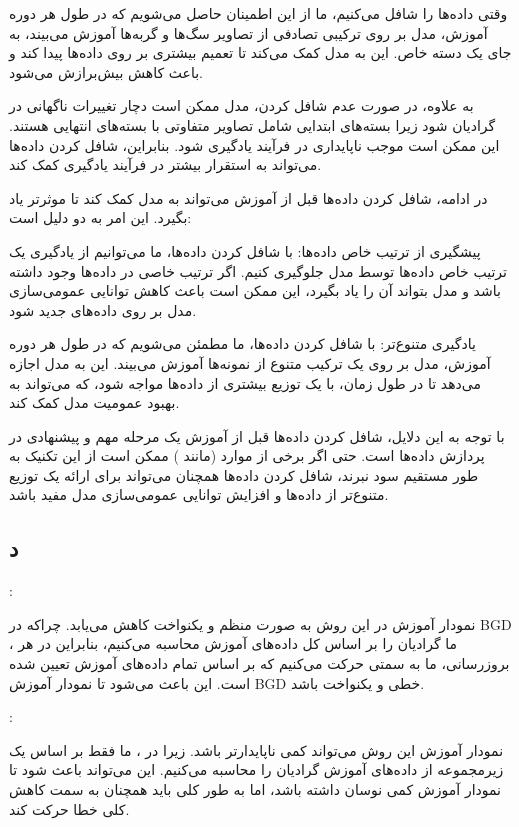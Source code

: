 وقتی داده‌ها را شافل می‌کنیم، ما از این اطمینان حاصل می‌شویم که در طول هر دوره آموزش، مدل بر روی ترکیبی تصادفی از تصاویر سگ‌ها و گربه‌ها آموزش می‌بیند، به جای یک دسته خاص. این به مدل کمک می‌کند تا تعمیم بیشتری بر روی داده‌ها پیدا کند و باعث کاهش بیش‌برازش می‌شود.

به علاوه، در صورت عدم شافل کردن، مدل ممکن است دچار تغییرات ناگهانی در گرادیان شود زیرا بسته‌های ابتدایی شامل تصاویر متفاوتی با بسته‌های انتهایی هستند. این ممکن است موجب ناپایداری در فرآیند یادگیری شود. بنابراین، شافل کردن داده‌ها می‌تواند به استقرار بیشتر در فرآیند یادگیری کمک کند.

در ادامه، شافل کردن داده‌ها قبل از آموزش می‌تواند به مدل کمک کند تا موثرتر یاد بگیرد. این امر به دو دلیل است:

پیشگیری از ترتیب خاص داده‌ها: با شافل کردن داده‌ها، ما می‌توانیم از یادگیری یک ترتیب خاص داده‌ها توسط مدل جلوگیری کنیم. اگر ترتیب خاصی در داده‌ها وجود داشته باشد و مدل بتواند آن را یاد بگیرد، این ممکن است باعث کاهش توانایی عمومی‌سازی مدل بر روی داده‌های جدید شود.

یادگیری متنوع‌تر: با شافل کردن داده‌ها، ما مطمئن می‌شویم که در طول هر دوره آموزش، مدل بر روی یک ترکیب متنوع از نمونه‌ها آموزش می‌بیند. این به مدل اجازه می‌دهد تا در طول زمان، با یک توزیع بیشتری از داده‌ها مواجه شود، که می‌تواند به بهبود عمومیت مدل کمک کند.

با توجه به این دلایل، شافل کردن داده‌ها قبل از آموزش یک مرحله مهم و پیشنهادی در پردازش داده‌ها است. حتی اگر برخی از موارد (مانند
) ممکن است از این تکنیک به طور مستقیم سود نبرند، شافل کردن داده‌ها همچنان می‌تواند برای ارائه یک توزیع متنوع‌تر از داده‌ها و افزایش توانایی عمومی‌سازی مدل مفید باشد.

\subsection*{د}

:

نمودار آموزش در این روش به صورت منظم و یکنواخت کاهش می‌یابد. چراکه در
BGD
، ما گرادیان را بر اساس کل داده‌های آموزش محاسبه می‌کنیم، بنابراین در هر بروزرسانی، ما به سمتی حرکت می‌کنیم که بر اساس تمام داده‌های آموزش تعیین شده است. این باعث می‌شود تا نمودار آموزش BGD خطی و یکنواخت باشد.

:

نمودار آموزش این روش می‌تواند کمی ناپایدارتر باشد. زیرا در
، ما فقط بر اساس یک زیرمجموعه از داده‌های آموزش گرادیان را محاسبه می‌کنیم. این می‌تواند باعث شود تا نمودار آموزش
کمی نوسان داشته باشد، اما به طور کلی باید همچنان به سمت کاهش کلی خطا حرکت کند.

